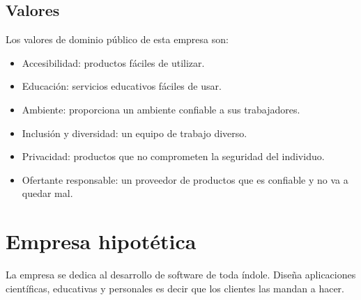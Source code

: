 \documentclass{article}
\begin{document}
\subsection{Valores}

Los valores de dominio público de esta empresa son: 
\begin{itemize}
    \item Accesibilidad: productos fáciles de utilizar.
    \item Educación: servicios educativos fáciles de usar.
    \item Ambiente: proporciona un ambiente confiable a sus trabajadores.
    \item Inclusión y diversidad: un equipo de trabajo diverso.
    \item Privacidad: productos que no comprometen la seguridad del individuo.
    \item Ofertante responsable: un proveedor de productos que es confiable y no va a quedar mal.
\end{itemize}





\section{Empresa hipotética}
La empresa se dedica al desarrollo de software de toda índole. Diseña aplicaciones científicas, educativas y personales es decir que los clientes las mandan a hacer.



\end{document}
